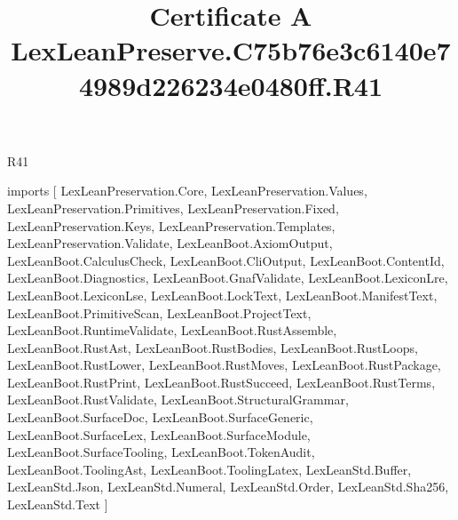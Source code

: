 \begin{lexlean}{R41}
\title{Certificate A LexLeanPreserve.C75b76e3c6140e74989d226234e0480ff.R41}
\begin{coremodule}
imports [
  LexLeanPreservation.Core,
  LexLeanPreservation.Values,
  LexLeanPreservation.Primitives,
  LexLeanPreservation.Fixed,
  LexLeanPreservation.Keys,
  LexLeanPreservation.Templates,
  LexLeanPreservation.Validate,
  LexLeanBoot.AxiomOutput,
  LexLeanBoot.CalculusCheck,
  LexLeanBoot.CliOutput,
  LexLeanBoot.ContentId,
  LexLeanBoot.Diagnostics,
  LexLeanBoot.GnafValidate,
  LexLeanBoot.LexiconLre,
  LexLeanBoot.LexiconLse,
  LexLeanBoot.LockText,
  LexLeanBoot.ManifestText,
  LexLeanBoot.PrimitiveScan,
  LexLeanBoot.ProjectText,
  LexLeanBoot.RuntimeValidate,
  LexLeanBoot.RustAssemble,
  LexLeanBoot.RustAst,
  LexLeanBoot.RustBodies,
  LexLeanBoot.RustLoops,
  LexLeanBoot.RustLower,
  LexLeanBoot.RustMoves,
  LexLeanBoot.RustPackage,
  LexLeanBoot.RustPrint,
  LexLeanBoot.RustSucceed,
  LexLeanBoot.RustTerms,
  LexLeanBoot.RustValidate,
  LexLeanBoot.StructuralGrammar,
  LexLeanBoot.SurfaceDoc,
  LexLeanBoot.SurfaceGeneric,
  LexLeanBoot.SurfaceLex,
  LexLeanBoot.SurfaceModule,
  LexLeanBoot.SurfaceTooling,
  LexLeanBoot.TokenAudit,
  LexLeanBoot.ToolingAst,
  LexLeanBoot.ToolingLatex,
  LexLeanStd.Buffer,
  LexLeanStd.Json,
  LexLeanStd.Numeral,
  LexLeanStd.Order,
  LexLeanStd.Sha256,
  LexLeanStd.Text
]


\end{coremodule}
\end{lexlean}
